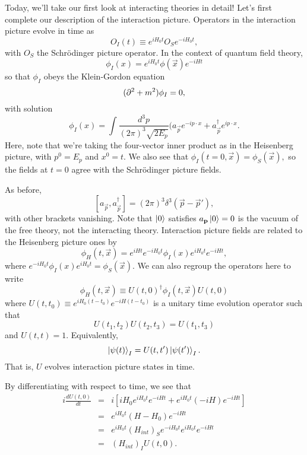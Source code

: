 Today, we'll take our first look at interacting theories in detail! Let's first complete our description of the interaction picture. Operators in the interaction picture evolve in time as
$$O_I(t) \equiv e^{iH_0t}O_S e^{-iH_0t},$$ with $O_S$ the Schr\"odinger picture operator. In the context of quantum field theory,
$$\phi_I(x)=e^{iH_0t}\phi(\vec x)e^{-iHt}$$
so that $\phi_I$ obeys the Klein-Gordon equation
$$(\partial^2+m^2)\phi_I=0,$$ with solution
$$\phi_I(x)=\int \frac{d^3p}{(2\pi)^3 \sqrt{2E_p}} (a_{\vec p} e^{-ip \cdot x}+ a_{\vec p}^\dagger e^{ip \cdot x}.$$
Here, note that we're taking the four-vector inner product as in the Heisenberg picture, with $p^0=E_p$ and $x^0=t$. We also see that
$\phi_I(t=0,\vec x)= \phi_S(\vec x),$ so the fields at $t=0$ agree with the Schr\"odinger picture fields.

As before,
$$[a_{\vec p},a_{\vec p}^\dagger]=(2\pi)^3 \delta^3(\vec p - \vec p'),$$ with other brackets vanishing. Note that $\left| 0 \right>$ satisfies $a_{\boldsymbol{\mathbf{p}}}\left| 0 \right>=0$ is the vacuum of the free theory, not the interacting theory. Interaction picture fields are related to the Heisenberg picture ones by
$$\phi_H(t,\vec x)=e^{iHt} e^{-iH_0t} \phi_I(x) e^{iH_0t} e^{-iHt},$$
where $e^{-iH_0t} \phi_I(x) e^{iH_0t}=\phi_S(\vec x).$ We can also regroup the operators here to write
$$\phi_H(t,\vec x)\equiv U(t,0)^\dagger \phi_I(t,\vec x) U(t,0)$$
where $U(t,t_0)\equiv e^{iH_0(t-t_0)}e^{-iH(t-t_0)}$ is a unitary time evolution operator such that
$$U(t_1,t_2)U(t_2,t_3)=U(t_1,t_3)$$ and $U(t,t)=1$. Equivalently,
$$\left| \psi(t) \right>_I=U(t,t')\left| \psi(t') \right>_I.$$ That is, $U$ evolves interaction picture states in time.

By differentiating with respect to time, we see that
\begin{eqnarray*}
i\frac{dU(t,0)}{dt}&=&i\left[iH_0 e^{iH_0 t}e^{-iHt}+e^{iH_0t}(-iH) e^{-iHt}\right]\\
&=&e^{iH_0t} (H-H_0)e^{-iHt}\\
&=&e^{iH_0t} (H_{int})_S e^{-iH_0t} e^{iH_0t} e^{-iHt}\\
&=&(H_{int})_I U(t,0).
\end{eqnarray*}

